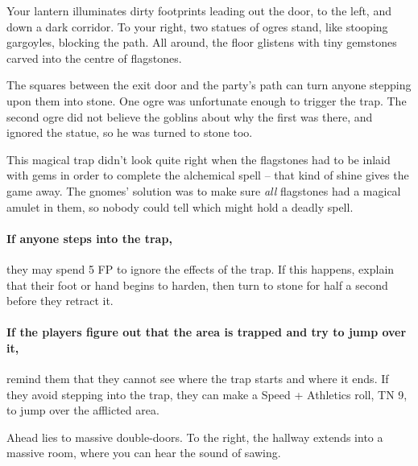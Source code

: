 \begin{multicols}{2}

\begin{boxtext}

	Your lantern illuminates dirty footprints leading out the door, to the left, and down a dark corridor.
	To your right, two statues of ogres stand, like stooping gargoyles, blocking the path.
	All around, the floor glistens with tiny gemstones carved into the centre of flagstones.

\end{boxtext}

The squares between the exit door and the party's path can turn anyone stepping upon them into stone.
One ogre was unfortunate enough to trigger the trap.
The second ogre did not believe the goblins about why the first was there, and ignored the statue, so he was turned to stone too.

This magical trap didn't look quite right when the flagstones had to be inlaid with gems in order to complete the alchemical spell -- that kind of shine gives the game away.
The gnomes' solution was to make sure \textit{all} flagstones had a magical amulet in them, so nobody could tell which might hold a deadly spell.

\paragraph{If anyone steps into the trap,}
they may spend 5 FP to ignore the effects of the trap.
If this happens, explain that their foot or hand begins to harden, then turn to stone for half a second before they retract it.

\paragraph{If the players figure out that the area is trapped and try to jump over it,}
remind them that they cannot see where the trap starts and where it ends.
If they avoid stepping into the trap, they can make a Speed + Athletics roll, TN 9, to jump over the afflicted area.


\begin{boxtext}

	Ahead lies to massive double-doors.
	To the right, the hallway extends into a massive room, where you can hear the sound of sawing.

\end{boxtext}


\end{multicols}
